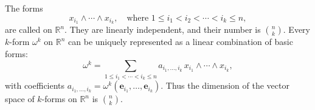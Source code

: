 The forms
$$x_{i_1} \wedge \cdots \wedge x_{i_k}, \quad \text{where } 1 \leq i_1 < i_2 < \cdots < i_k \leq n,$$
are called  on $\mathbb{R}^n$. They are linearly independent, and their number is $\binom{n}{k}$. Every $k$-form $\omega^k$ on $\mathbb{R}^n$ can be uniquely represented as a linear combination of basic forms:
$$\omega^k = \sum_{1 \leq i_1 < \cdots < i_k \leq n} a_{i_1, \ldots, i_k} \, x_{i_1} \wedge \cdots \wedge x_{i_k},$$
with coefficients $a_{i_1, \ldots, i_k} = \omega^k(\mathbf{e}_{i_1}, \ldots, \mathbf{e}_{i_k})$. Thus the dimension of the vector space of $k$-forms on $\mathbb{R}^n$ is $\binom{n}{k}$.
